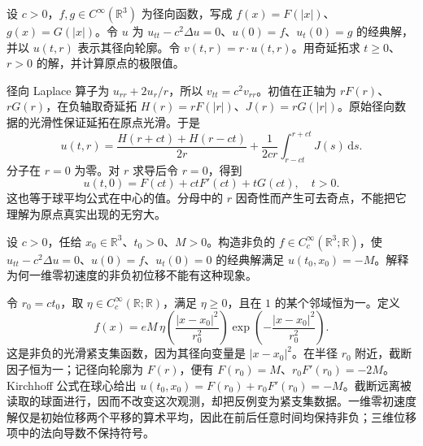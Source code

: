 \begin{exercise}\label{b2:ex:11-radial-reduction}
设 \(c>0\)，\(f,g\in C^\infty(\mathbb R^3)\) 为径向函数，写成 \(f(x)=F(|x|)\)、\(g(x)=G(|x|)\)。令 \(u\) 为 \(u_{tt}-c^2\Delta u=0\)、\(u(0)=f\)、\(u_t(0)=g\) 的经典解，并以 \(u(t,r)\) 表示其径向轮廓。令 \(v(t,r)=r\cdot u(t,r)\)。用奇延拓求 \(t\geq0\)、\(r>0\) 的解，并计算原点的极限值。
\end{exercise}
\begin{solution}
径向 Laplace 算子为 \(u_{rr}+2u_r/r\)，所以 \(v_{tt}=c^2v_{rr}\)。初值在正轴为 \(rF(r)\)、\(rG(r)\)，在负轴取奇延拓 \(H(r)=rF(|r|)\)、\(J(r)=rG(|r|)\)。原始径向数据的光滑性保证延拓在原点光滑。于是
\[
 u(t,r)=\dfrac{H(r+ct)+H(r-ct)}{2r}
       +\dfrac1{2cr}\int_{r-ct}^{r+ct}J(s)\,\mathrm{d}s.
\]
分子在 \(r=0\) 为零。对 \(r\) 求导后令 \(r=0\)，得到
\[
 u(t,0)=F(ct)+ctF'(ct)+tG(ct),\quad t>0.
\]
这也等于球平均公式在中心的值。分母中的 \(r\) 因奇性而产生可去奇点，不能把它理解为原点真实出现的无穷大。
\end{solution}

\begin{exercise}\label{b2:ex:11-positivity-failure}
设 \(c>0\)，任给 \(x_0\in\mathbb R^3\)、\(t_0>0\)、\(M>0\)。构造非负的 \(f\in C_c^\infty(\mathbb R^3;\mathbb R)\)，使 \(u_{tt}-c^2\Delta u=0\)、\(u(0)=f\)、\(u_t(0)=0\) 的经典解满足 \(u(t_0,x_0)=-M\)。解释为何一维零初速度的非负初位移不能有这种现象。
\end{exercise}
\begin{solution}
令 \(r_0=ct_0\)，取 \(\eta\in C_c^\infty(\mathbb R;\mathbb R)\)，满足 \(\eta\geq0\)，且在 \(1\) 的某个邻域恒为一。定义
\[
 f(x)=eM\,\eta\left(\frac{|x-x_0|^2}{r_0^2}\right)
             \exp\left(-\frac{|x-x_0|^2}{r_0^2}\right).
\]
这是非负的光滑紧支集函数，因为其径向变量是 \(|x-x_0|^2\)。在半径 \(r_0\) 附近，截断因子恒为一；记径向轮廓为 \(F(r)\)，便有 \(F(r_0)=M\)、\(r_0F'(r_0)=-2M\)。Kirchhoff 公式在球心给出 \(u(t_0,x_0)=F(r_0)+r_0F'(r_0)=-M\)。截断远离被读取的球面进行，因而不改变这次观测，却把反例变为紧支集数据。一维零初速度解仅是初始位移两个平移的算术平均，因此在前后任意时间均保持非负；三维位移项中的法向导数不保持符号。
\end{solution}

